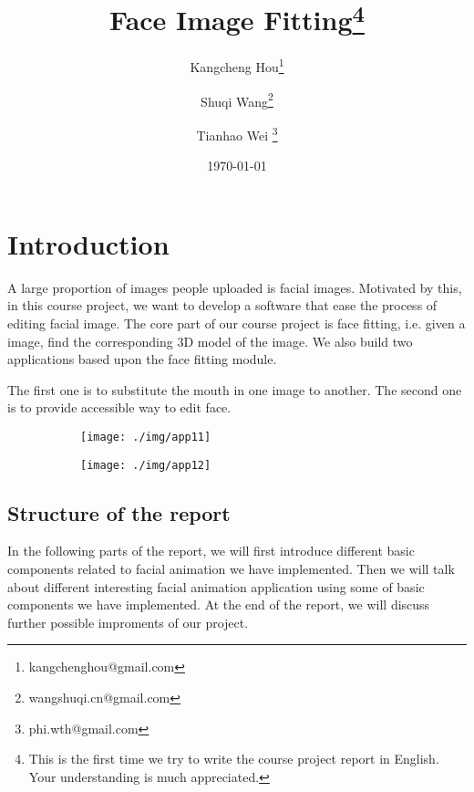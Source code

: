 \documentclass{article}
\title{Face Image Fitting\footnote{This is the first time we try to write the course project report in English. Your understanding is much appreciated.}}
\author{Kangcheng Hou\footnote{kangchenghou@gmail.com} \and Shuqi Wang\footnote{wangshuqi.cn@gmail.com} \and Tianhao Wei \footnote{phi.wth@gmail.com}}
\date{\today}
\begin{document}
\maketitle
\tableofcontents

\section{Introduction}
A large proportion of images people uploaded is facial images. Motivated by this, in this course project, we want to develop a software that ease the process of editing facial image. The core part of our course project is face fitting, i.e. given a image, find the corresponding 3D model of the image. We also build two applications based upon the face fitting module.

The first one is to substitute the mouth in one image to another. The second one is to provide accessible way to edit face.
\begin{figure}
    \centering
    \begin{subfigure}[t]{0.5\textwidth}
        \centering
        \texttt{[image: ./img/app11]}
    \end{subfigure}
    \begin{subfigure}[t]{0.5\textwidth}
        \centering
        \texttt{[image: ./img/app12]}
    \end{subfigure}
\end{figure}
\subsection{Structure of the report}
In the following parts of the report, we will first introduce different basic components related to facial animation we have implemented. Then we will talk about different interesting facial animation application using some of basic components we have implemented. At the end of the report, we will discuss further possible improments of our project.



\end{document}
